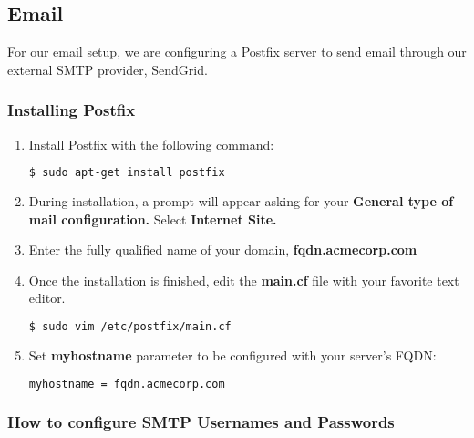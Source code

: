 \subsection{Email}

For our email setup, we are configuring a Postfix server to send email through
our external SMTP provider, SendGrid.

\subsubsection{Installing Postfix}

\begin{enumerate}
 \item { Install Postfix with the following command:
  \begin{lstlisting}[language=bash] 
  $ sudo apt-get install postfix
   \end{lstlisting}
 }
 \item { During installation, a prompt will appear asking for your
	 \textbf{General type of mail configuration.} Select \textbf{Internet
		Site.}
 }
 \item {Enter the fully qualified name of your domain, \textbf{fqdn.acmecorp.com}
 }
 \item {Once the installation is finished, edit the \textbf{main.cf} file with
	 your favorite text editor.
   \begin{lstlisting}[language=bash]
 $ sudo vim /etc/postfix/main.cf
   \end{lstlisting}
 }
 \item {Set \textbf{myhostname} parameter to be configured with your server's
	 FQDN:
   \begin{lstlisting}[language=bash]
 myhostname = fqdn.acmecorp.com
   \end{lstlisting}
 }
\end{enumerate}

\subsubsection{How to configure SMTP Usernames and Passwords}

